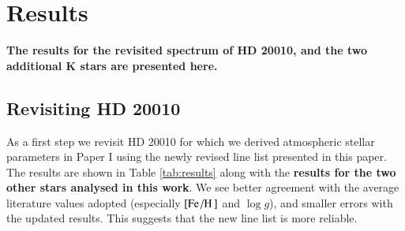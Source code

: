 \documentclass{aa}
\begin{document}
\section{Results}
\label{sec:results}

{\bf The results for the revisited spectrum of HD 20010, and the two additional
K stars are presented here.}

\subsection{Revisiting HD 20010}
\label{sec:hd20010}

As a first step we revisit HD 20010 for which we derived atmospheric stellar
parameters in Paper I using the newly revised line list presented in this paper.
The results are shown in Table \ref{tab:results} along with the {\bf results for
the two other stars analysed in this work}. We see better agreement with the
average literature values adopted (especially $[\ion{Fe}/\ion{H}]$ and $\log g$),
and smaller errors with the updated results. This suggests that the new line
list is more reliable.
\end{document}
